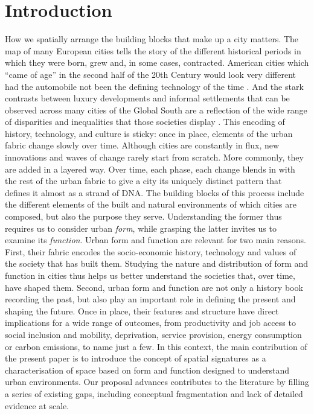 \section{Introduction}
\label{sec:intro}

How we spatially arrange the building blocks that make up a city matters.
%
The map of many European cities tells the story of the different historical
periods in which they were born, grew and, in some cases, contracted.
%
American cities which ``came of age'' in the second half of the 20th Century
would look very different had the automobile not been the defining
technology of the time \citep{jacobs2016death}.
%
And the stark contrasts between luxury developments and informal settlements
that can be observed across many cities of the Global South are a reflection
of the wide range of disparities and inequalities that those societies
display \citep{alsayyad2003urban}.
%
This encoding of history, technology, and culture is sticky: once in place,
elements of the urban fabric change slowly over time. Although cities are constantly in flux, new
innovations and waves of change rarely start from scratch. More commonly, they
are added in a layered way. Over time, each phase, each change blends in with the rest
of the urban fabric to give a city its uniquely distinct pattern that defines
it almost as a strand of DNA.
The building blocks of this process include the different
elements of the built and natural environments of which cities are composed,
but also the purpose they serve.
Understanding the former thus requires us to consider urban \textit{form}, while
grasping the latter invites us to examine its \textit{function}.
Urban form and function are relevant for two main reasons. First, their fabric
encodes the socio-economic history, technology and values
of the society that has built them.
%
Studying the nature and distribution
of form and function in cities thus helps us better understand the societies
that, over time, have shaped them.
Second, urban form and function are
not only a history book recording the past, but also play an important role in
defining the present and shaping the future.
%
Once in place, their features and structure have direct implications for a
wide range of outcomes, from productivity and job access to social inclusion
and mobility, deprivation, service provision, energy consumption or carbon
emissions, to name just a few.
% 
In this context, the main contribution of the present paper is to
introduce the concept of spatial signatures as a characterisation of
space based on form and function designed to understand urban environments.
Our proposal advances contributes to the literature by filling a series of
existing gaps, including conceptual fragmentation and lack of detailed
evidence at scale.

